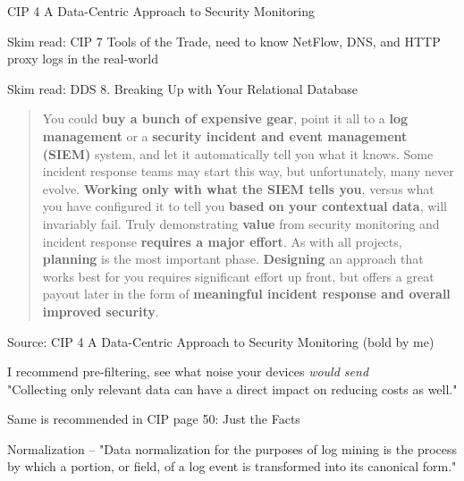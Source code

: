 \documentclass[Screen16to9,17pt]{foils}
\begin{document}

\begin{list1}
\item CIP 4 A Data-Centric Approach to Security Monitoring
\item Skim read: CIP 7 Tools of the Trade, need to know NetFlow, DNS, and HTTP proxy logs in the real-world
\item Skim read: DDS 8. Breaking Up with Your Relational Database
\end{list1}



\begin{quote}\small
You could {\bf buy a bunch of expensive gear}, point it all to a {\bf log management} or a {\bf security incident and event management (SIEM)} system, and let it automatically tell you what it knows. Some incident response teams may start this way, but unfortunately, many never evolve. {\bf Working only with what the SIEM tells you}, versus what you have configured it to tell you {\bf based on your contextual data}, will invariably fail. Truly demonstrating {\bf value} from security monitoring and incident response {\bf requires a major effort}. As with all projects, {\bf planning} is the most important phase. {\bf Designing} an approach that works best for you requires significant effort up front, but offers a great payout later in the form of {\bf meaningful incident response and overall improved security}.
\end{quote}
Source: CIP 4 A Data-Centric Approach to Security Monitoring (bold by me)


\begin{list2}
\item I recommend pre-filtering, see what noise your devices \emph{would send}\\
"Collecting only relevant data can have a direct impact on reducing costs as well."
\item Same is recommended in CIP page 50: Just the Facts
\item Normalization -- "Data normalization for
the purposes of log mining is the process by which a portion, or field, of a log event is
transformed into its canonical form."
\end{list2}


\end{document}
